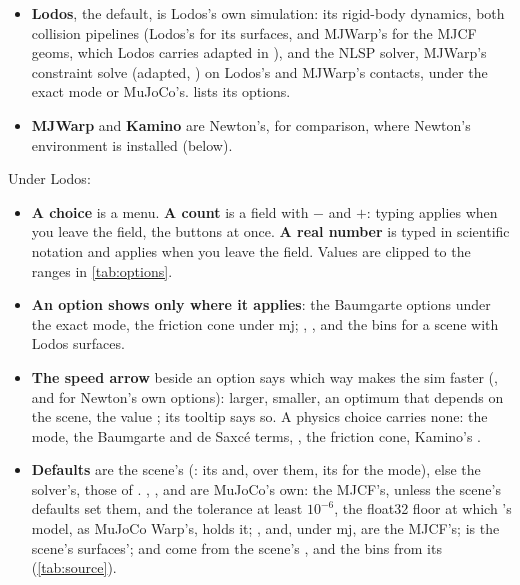 \begin{itemize}
\item \textbf{Lodos}, the default, is Lodos's own simulation: its rigid-body dynamics, both collision pipelines (Lodos's for its surfaces, and MJWarp's for the MJCF geoms, which Lodos carries adapted in ), and the NLSP solver, MJWarp's constraint solve (adapted, ) on Lodos's and MJWarp's contacts, under the exact mode or MuJoCo's.  lists its options.
\item \textbf{MJWarp} and \textbf{Kamino} are Newton's, for comparison, where Newton's environment is installed (below).
\end{itemize}

Under Lodos:

\begin{itemize}
\item \textbf{A choice} is a menu. \textbf{A count} is a field with $-$ and $+$: typing applies when you leave the field, the buttons at once. \textbf{A real number} is typed in scientific notation and applies when you leave the field. Values are clipped to the ranges in \cref{tab:options}.
\item \textbf{An option shows only where it applies}: the Baumgarte options under the exact mode, the friction cone under mj; , ,  and the bins for a scene with Lodos surfaces.
\item \textbf{The speed arrow} beside an option says which way makes the sim faster (, and  for Newton's own options): \code{^} larger,  smaller, \code{<>} an optimum that depends on the scene,  the value ; its tooltip says so. A physics choice carries none: the mode, the Baumgarte and de Saxcé terms, , the friction cone, Kamino's .
\item \textbf{Defaults} are the scene's (: its  and, over them, its  for the mode), else the solver's, those of . , ,  and  are MuJoCo's own: the MJCF's, unless the scene's defaults set them, and the tolerance at least $10^{-6}$, the float32 floor at which 's model, as MuJoCo Warp's, holds it; ,  and, under mj,  are the MJCF's;  is the scene's surfaces';  and  come from the scene's , and the bins from its  (\cref{tab:source}).

\end{itemize}
